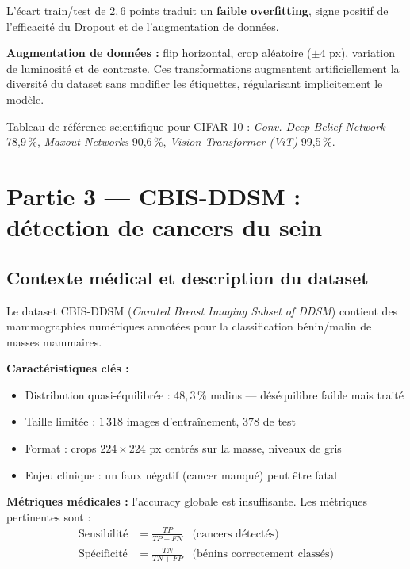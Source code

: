 \documentclass[a4paper,11pt]{article}
\begin{document}
L'écart train/test de $2{,}6$ points traduit un \textbf{faible overfitting},
signe positif de l'efficacité du Dropout et de l'augmentation de données.

\textbf{Augmentation de données :} flip horizontal, crop aléatoire ($\pm4$ px), variation
de luminosité et de contraste. Ces transformations augmentent artificiellement la diversité
du dataset sans modifier les étiquettes, régularisant implicitement le modèle.

Tableau de référence scientifique pour CIFAR-10 :
\textit{Conv. Deep Belief Network} 78{,}9\,\%,
\textit{Maxout Networks} 90{,}6\,\%,
\textit{Vision Transformer (ViT)} 99{,}5\,\%.

\section{Partie 3 — CBIS-DDSM : détection de cancers du sein}

\subsection{Contexte médical et description du dataset}

Le dataset CBIS-DDSM (\textit{Curated Breast Imaging Subset of DDSM}) contient des
mammographies numériques annotées pour la classification bénin/malin de masses mammaires.

\textbf{Caractéristiques clés :}
\begin{itemize}[leftmargin=*]
  \item Distribution quasi-équilibrée : $48{,}3\,\%$ malins — déséquilibre faible mais traité
  \item Taille limitée : $1\,318$ images d'entraînement, $378$ de test
  \item Format : crops $224\times224$ px centrés sur la masse, niveaux de gris
  \item Enjeu clinique : un faux négatif (cancer manqué) peut être fatal
\end{itemize}

\textbf{Métriques médicales :} l'accuracy globale est insuffisante. Les métriques pertinentes sont :
\begin{align*}
  \text{Sensibilité} &= \frac{TP}{TP+FN} & \text{(cancers détectés)} \\
  \text{Spécificité} &= \frac{TN}{TN+FP} & \text{(bénins correctement classés)}
\end{align*}
\end{document}
